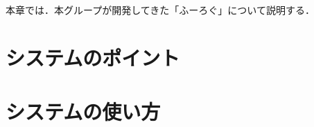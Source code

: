 \documentclass[../report]{subfiles}
\begin{document}
本章では．本グループが開発してきた「ふーろぐ」について説明する．


\section{システムのポイント}


\section{システムの使い方}
\end{document}

